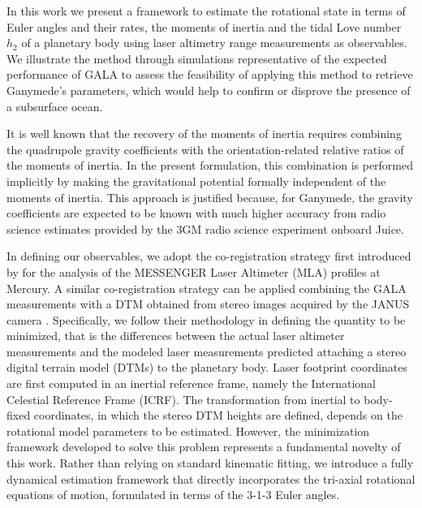 \documentclass[lineno, pdflatex,sn-mathphys-ay]{sn-jnl}
\theoremstyle{thmstyleone}%
\theoremstyle{thmstyletwo}%
\theoremstyle{thmstylethree}%
\begin{document}

In this work we present a framework to estimate the rotational state in terms of Euler angles and their rates, the moments of inertia and the tidal Love number $h_2$ of a planetary body using laser altimetry range measurements as observables. 
%
We illustrate the method through simulations representative of the expected performance of GALA to assess the feasibility of applying this method to retrieve Ganymede's parameters, which would help to confirm or disprove the presence of a subsurface ocean. 

It is well known \citep[see, e.g.,][]{2014JGRE..119.1546W} that the recovery of the moments of inertia requires combining the quadrupole gravity coefficients with the orientation-related relative ratios of the moments of inertia. 
%
In the present formulation, this combination is performed implicitly by making the gravitational potential formally independent of the moments of inertia. This approach is justified because, for Ganymede, the gravity coefficients are expected to be known with much higher accuracy from radio science estimates provided by the 3GM
\citep[Geodesy and Geophysics of Jupiter and the Galilean Moons ][]{2020P&SS..18704902C} radio science experiment onboard Juice.


In defining our observables, we adopt the co-registration strategy first introduced by \cite{2015GeoRL..42.7881S} for the analysis of the MESSENGER Laser Altimeter (MLA) profiles at Mercury. 
%
A similar co-registration strategy can be applied combining the GALA measurements with a DTM obtained from stereo images acquired by the JANUS camera \citep[Jovis, Amorum ac Natorum Undique Scrutator;][]{2025SSRv..221...32P}.
%
Specifically, we follow their methodology in defining the quantity to be minimized, that is the differences between the actual laser altimeter measurements and the modeled laser measurements predicted attaching a stereo digital terrain model (DTMs) to the planetary body.
%
Laser footprint coordinates are first computed in an inertial reference frame, namely the International Celestial Reference Frame (ICRF). The transformation from inertial to body-fixed coordinates, in which the stereo DTM heights are defined, depends on the rotational model parameters to be estimated.
%
However, the minimization framework developed to solve this problem represents a fundamental novelty of this work. Rather than relying on standard kinematic fitting, we introduce a fully dynamical estimation framework that directly incorporates the  tri-axial rotational equations of motion, formulated in terms of the 3-1-3 Euler angles. 
\end{document}
